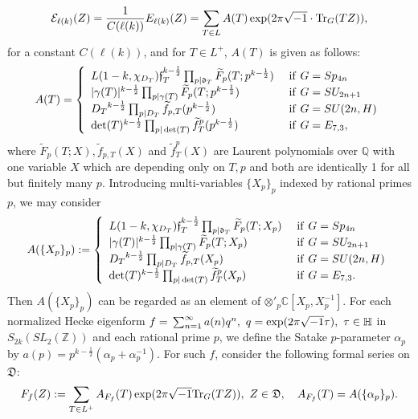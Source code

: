 \documentclass[11pt]{amsart}
\numberwithin{equation}{section}
\theoremstyle{definition}
\begin{document}
$${\mathcal{E}}_{\ell(k)}(Z)=\frac{1}{C(\ell(k))}E_{\ell(k)}(Z)=\sum_{T\in L} A(T)\exp(2\pi\sqrt{-1}\cdot {{\rm Tr}}_G(TZ)),
$$
for a constant $C(\ell(k))$, and for $T\in L^+$, $A(T)$ is given as follows:
$$
A(T)=\left\{
\begin{array}{ll}
L(1-k,\chi_{D_T})\mathfrak{f}^{k-\frac{1}{2}}_T{\displaystyle}\prod_{p|\mathfrak{d}_T}\widetilde{F}_{p}(T;p^{k-\frac{1}{2}})  &\ {\rm if}\ G=Sp_{4n} \\
|\gamma(T)|^{k-\frac{1}{2}}{\displaystyle}\prod_{p|\gamma(T)}\widetilde{F}_{p}(T;p^{k-\frac{1}{2}})  &\ {\rm if}\ G=SU_{2n+1} \\
{D_T}^{k-\frac{1}{2}}{\displaystyle}\prod_{p|D_T}\widetilde{f}_{p,T}(p^{k-\frac{1}{2}})&\ {\rm if}\ G=SU(2n,H) \\
\det(T)^{k-\frac{1}{2}}{\displaystyle}\prod_{p|\det(T)} \widetilde{f}^p_T(p^{k-\frac{1}{2}})&\ {\rm if}\ G=E_{7,3},
\end{array}\right.
$$
where $\widetilde{F}_{p}(T;X), \widetilde{f}_{p,T}(X)$ and $ \widetilde{f}^p_T(X)$ are Laurent polynomials over ${\mathbb{Q}}$ with one variable $X$
which are depending only on
$T,p$ and both are identically 1 for all but finitely many $p$. Introducing
multi-variables $\{X_p\}_p$ indexed by rational primes $p$, we may consider
$$
A(\{X_p\}_p):=\left\{
\begin{array}{ll}
L(1-k,\chi_{D_T})\mathfrak{f}^{k-\frac{1}{2}}_T{\displaystyle}\prod_{p|\mathfrak{d}_T}\widetilde{F}_{p}(T;X_p)  &\ {\rm if}\ G=Sp_{4n} \\
|\gamma(T)|^{k-\frac{1}{2}}{\displaystyle}\prod_{p|\gamma(T)}\widetilde{F}_{p}(T;X_p)  &\ {\rm if}\ G=SU_{2n+1} \\
{D_T}^{k-\frac{1}{2}}{\displaystyle}\prod_{p|D_T}\widetilde{f}_{p,T}(X_p)&\ {\rm if}\ G=SU(2n,H) \\
\det(T)^{k-\frac{1}{2}}{\displaystyle}\prod_{p|\det(T)} \widetilde{f}^p_T(X_p)&\ {\rm if}\ G=E_{7,3}.
\end{array}\right.
$$
Then $A(\{X_p\}_p)$ can be regarded as
an element of $\otimes'_p{\mathbb{C}}[X_p,X^{-1}_p]$.
For each normalized Hecke eigenform $f={\displaystyle}\sum_{n=1}^\infty a(n)q^n,\ q=\exp(2\pi \sqrt{-1}\tau),\ \tau\in \mathbb{H}$ in $S_{2k}(SL_2({\mathbb{Z}}))$ and each rational prime $p$,
we define the Satake $p$-parameter $\alpha_p$ by $a(p)=p^{k-\frac{1}{2}}(\alpha_p+\alpha^{-1}_p)$.
For such $f$, consider the following formal series on ${\mathfrak{D}}$:
$$F_f(Z):=\sum_{T\in L^+} A_{F_f}(T)\exp(2\pi\sqrt{-1}{{\rm Tr}}_G(TZ)),\ Z\in \frak D, \quad
A_{F_f}(T)=A(\{\alpha_p\}_p).
$$
\end{document}
